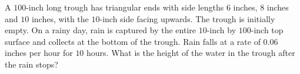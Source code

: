 A $100$-inch long trough has triangular ends with side lengths $6$ inches, $8$ inches and $10$ inches, with the $10$-inch side facing upwards. The trough is initially empty. On a rainy day, rain is captured by the entire $10$-inch by $100$-inch top surface and collects at the bottom of the trough. Rain falls at a rate of $0.06$ inches per hour for $10$ hours. What is the height of the water in the trough after the rain stops?
